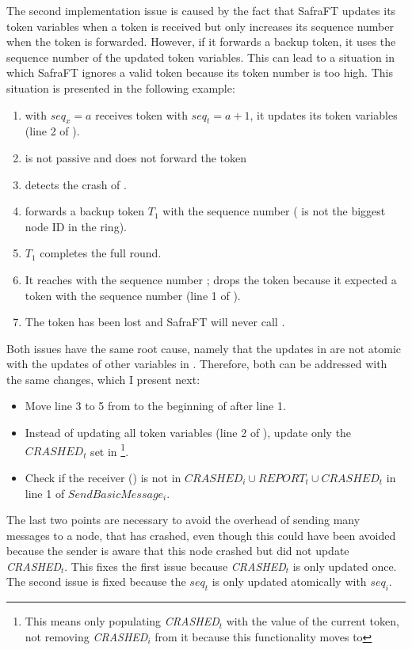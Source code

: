 The second implementation issue is caused by the fact that SafraFT updates its token variables when a token is received but only increases its sequence number when the token is forwarded.
However, if it forwards a backup token, it uses the sequence number of the updated token variables.
This can lead to a situation in which SafraFT ignores a valid token because its token number is too high. This situation is presented in the following example:

\begin{enumerate}
	\item {} with $seq_x = a$ receives token  with $seq_t=a+1$, it updates its token variables (line 2 of ).
	\item {} is not passive and does not forward the token
	\item {} detects the crash of .
	\item {} forwards a backup token $T_1$ with the sequence number  ( is not the biggest node ID in the ring).
	\item $T_1$ completes the full round.
	\item It reaches  with the sequence number ;  drops the token because it expected a token with the sequence number  (line 1 of ).
	\item The token has been lost and SafraFT will never call .
\end{enumerate}

Both issues have the same root cause, namely that the updates in  are not atomic with the updates of other variables in .
Therefore, both can be addressed with the same changes, which I present next:
\begin{itemize}
	\item Move line 3 to 5 from  to the beginning of  after line 1.
	\item Instead of updating all token variables (line 2 of ), update only the $CRASHED_t$ set in \footnote{This means only populating \textit{CRASHED}$_t$ with the value of the current token, not removing \textit{CRASHED}$_i$ from it because this functionality moves to }.
	\item Check if the receiver () is not in $CRASHED_i \cup REPORT_t \cup CRASHED_t$ in line 1 of $SendBasicMessage_i$.
\end{itemize}

The last two points are necessary to avoid the overhead of sending many messages to a node, that has crashed, even though this could have been avoided because the sender is aware that this node crashed but did not update \textit{CRASHED}$_t$.
This fixes the first issue because \textit{CRASHED}$_t$ is only updated once.
The second issue is fixed because the $seq_t$ is only updated atomically with $seq_i$.